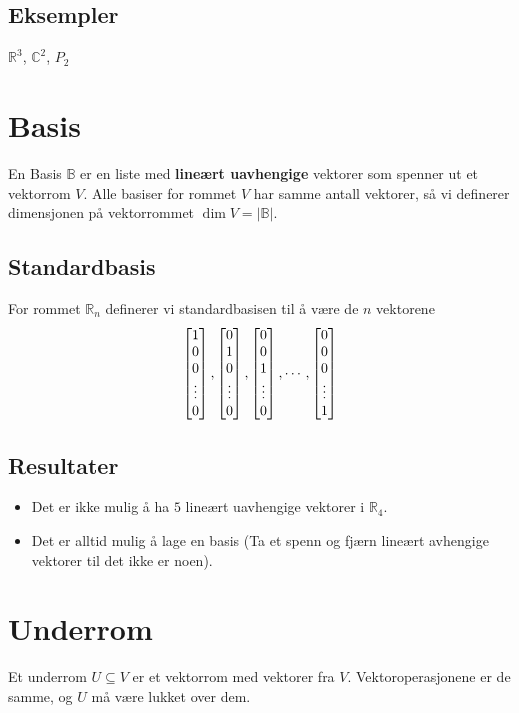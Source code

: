 \documentclass[12pt,a4paper,norsk]{article}
\makeatletter
\newcommand{\R}{\mathbb{R}}
\newcommand{\C}{\mathbb{C}}
\newcommand{\B}{\mathbb{B}}
\newcommand{\mat}[2]{\left[\begin{array}{@{}#1@{}}#2\end{array}\right]}
\makeatother
\begin{document}
\subsection{Eksempler}
$\R^{3}$, $\C^{2}$, $P_{2}$

\section{Basis}
En Basis $\B$ er en liste med \textbf{lineært uavhengige} vektorer som spenner ut et
vektorrom $V$. Alle basiser for rommet $V$ har samme antall vektorer, så vi
definerer dimensjonen på vektorrommet $\dim{V} = |\B|$.

\subsection{Standardbasis}
For rommet $\R_{n}$ definerer vi standardbasisen til å være de $n$ vektorene
\[\mat{c}{1\\0\\0\\ \vdots \\ 0}, \mat{c}{0\\1\\0\\ \vdots \\ 0}, \mat{c}{0\\0\\1\\ \vdots \\ 0}, \cdots, \mat{c}{0\\0\\0\\ \vdots \\ 1}\]

\subsection{Resultater}
\begin{itemize}
  \item Det er ikke mulig å ha $5$ lineært uavhengige vektorer i $\R_{4}$.
  \item Det er alltid mulig å lage en basis (Ta et spenn og fjærn lineært
    avhengige vektorer til det ikke er noen).
\end{itemize}

\section{Underrom}
Et underrom $U \subseteq V$ er et vektorrom med vektorer fra $V$.
Vektoroperasjonene er de samme, og $U$ må være lukket over dem.
\end{document}
